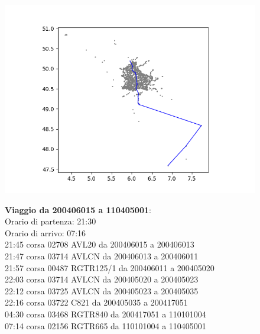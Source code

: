 \documentclass{article}
\begin{document}
\begin{figure}[H]
	\begin{minipage}{0.55\linewidth}
		\centering
		\hspace*{-3cm}\includegraphics[width=1.0\linewidth, valign=t]{figures/Figure_1}
	\end{minipage}
	\hspace*{-2cm}\begin{minipage}{0.7\linewidth}
		\textbf{Viaggio da 200406015 a 110405001}:\\
		Orario di partenza: 21:30\\
		Orario di arrivo: 07:16\\
		21:45 corsa 02708 AVL20 da 200406015 a 200406013\\
		21:47 corsa 03714 AVLCN da 200406013 a 200406011\\
		21:57 corsa 00487 RGTR125/1 da 200406011 a 200405020\\
		22:03 corsa 03714 AVLCN da 200405020 a 200405023\\
		22:12 corsa 03725 AVLCN da 200405023 a 200405035\\
		22:16 corsa 03722 C821 da 200405035 a 200417051\\
		04:30 corsa 03468 RGTR840 da 200417051 a 110101004\\
		07:14 corsa 02156 RGTR665 da 110101004 a 110405001
		
\end{minipage}
\end{figure}
\end{document}
